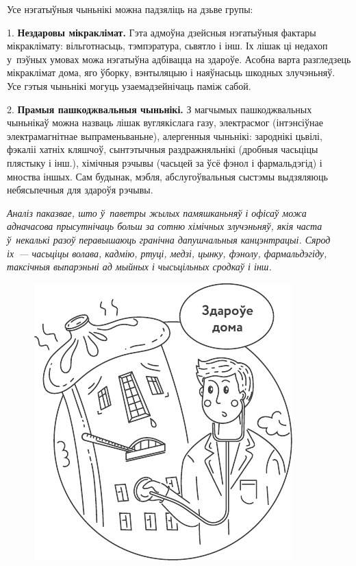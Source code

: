 Усе нэгатыўныя чыньнікі можна падзяліць на дзьве групы:

1. \textbf{Нездаровы мікраклімат.} Гэта адмоўна дзейсныя нэгатыўныя фактары мікраклімату: вільготнасьць, тэмпэратура, сьвятло і інш. Іх лішак ці недахоп у~пэўных умовах можа нэгатыўна адбівацца на здароўе. Асобна варта разгледзець мікраклімат дома, яго ўборку, вэнтыляцыю і наяўнасьць шкодных злучэньняў. Усе гэтыя чыньнікі могуць узаемадзейнічаць паміж сабой.

2. \textbf{Прамыя пашкоджвальныя чыньнікі.} З магчымых пашкоджвальных чыньнікаў можна назваць лішак вуглякіслага газу, электрасмог (інтэнсіўнае электрамагнітнае выпраменьваньне), алергенныя чыньнікі: зароднікі цьвілі, фэкаліі хатніх кляшчоў, сынтэтычныя раздражняльнікі (дробныя часьціцы плястыку і інш.), хімічныя рэчывы (часьцей за ўсё фэнол і фармальдэгід) і мноства іншых. Сам будынак, мэбля, абслугоўвальныя сыстэмы выдзяляюць небясьпечныя для здароўя рэчывы.

\emph{Аналіз паказвае, што ў~паветры жылых памяшканьняў і офісаў можа адначасова прысутнічаць больш за сотню хімічных злучэньняў, якія часта ў~некалькі разоў перавышаюць гранічна дапушчальныя канцэнтрацыі. Сярод іх~--- часьціцы волава, кадмію, ртуці, медзі, цынку, фэнолу, фармальдэгіду, таксічныя выпарэньні ад мыйных і чысьцільных сродкаў і інш.}

\begin{figure}[htb!]
  \centering
  \includegraphics[scale=1.2]{willpower/ch11/8.pdf}
\end{figure}

